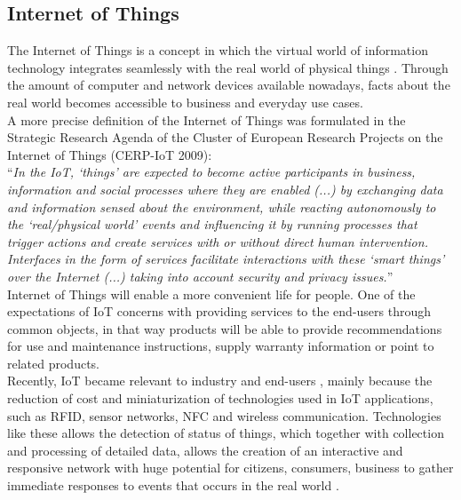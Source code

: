 \subsection{Internet of Things}
\label{sub:internet_of_things}
The Internet of Things is a concept in which the virtual world of information
technology integrates seamlessly with the real world of physical things \cite{Uckelmann:2011:AIT:2018904}.
Through the amount of computer and network devices available nowadays, facts about
the real world becomes accessible to business and everyday use cases.\\

A more precise definition of the Internet of Things was formulated in the Strategic
Research Agenda of the Cluster of European Research Projects on the Internet of Things (CERP-IoT 2009):\\

``\textit{In the IoT, `things' are expected to become active participants in business,
information and social processes where they are enabled (...) by exchanging data
and information  sensed about the environment, while reacting autonomously to the
`real/physical world' events and influencing it by running processes that trigger
actions and create services with or without direct human intervention. Interfaces
in the form of services facilitate interactions with these `smart things' over the
Internet (...) taking into account security and privacy issues.}''\\

Internet of Things will enable a more convenient life for people. One of the expectations
of IoT concerns with providing services to the end-users through common objects, in that way
products will be able to provide recommendations for use and maintenance instructions, supply warranty
information or point to related products.\\

Recently, IoT became relevant to industry and end-users \cite{Uckelmann:2011:AIT:2018904},
mainly because the reduction of cost and  miniaturization of technologies used in IoT applications,
such as RFID, sensor networks, NFC and  wireless communication. Technologies like these allows
the detection of status of things, which  together with collection and processing of detailed
data, allows the creation of an interactive  and responsive network with huge potential
for citizens, consumers, business to gather immediate responses to events that occurs
in the real world \cite{Uckelmann:2011:AIT:2018904}.\\


